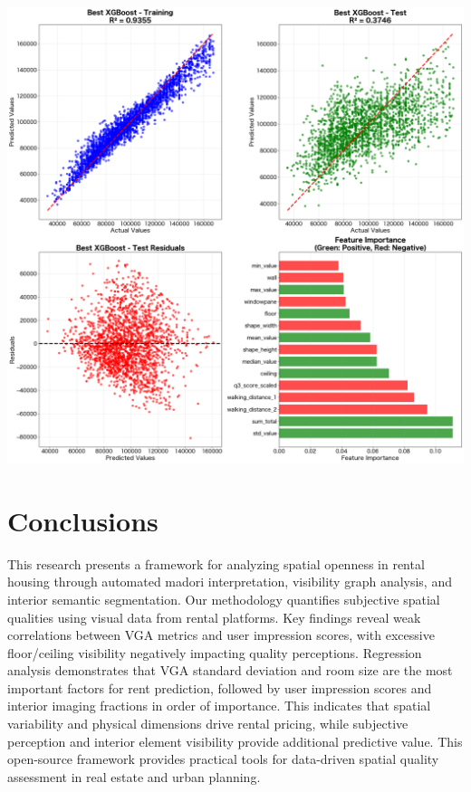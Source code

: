 \documentclass[11pt,a4paper]{article}
\begin{document}
\begin{multicols}{2}
\begin{center}
    \includegraphics[width=0.9\columnwidth]{plots/rent_regression.png}
    \label{fig:rent_regression}
\end{center}

\vspace{1em}

\section{Conclusions}

This research presents a framework for analyzing spatial openness in rental housing through automated madori
interpretation, visibility graph analysis, and interior semantic segmentation. Our methodology quantifies subjective 
spatial qualities using visual data from rental platforms. Key findings reveal weak correlations between VGA metrics 
and user impression scores, with excessive floor/ceiling visibility negatively impacting quality perceptions. 
Regression analysis demonstrates that VGA standard deviation and room size are the most important factors for rent 
prediction, followed by user impression scores and interior imaging fractions in order of importance. This indicates 
that spatial variability and physical dimensions drive rental pricing, while subjective perception and interior 
element visibility provide additional predictive value. This open-source framework provides practical tools for 
data-driven spatial quality assessment in real estate and urban planning.



\end{multicols}
\end{document}
